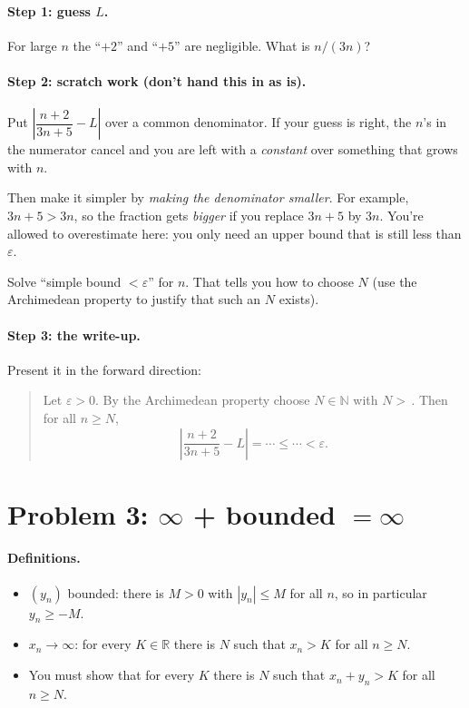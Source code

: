 \documentclass[11pt]{article}
\begin{document}
\paragraph{Step 1: guess $L$.} For large $n$ the ``$+2$'' and ``$+5$'' are
negligible. What is $n/(3n)$?

\paragraph{Step 2: scratch work (don't hand this in as is).}
Put $\left|\dfrac{n+2}{3n+5}-L\right|$ over a common denominator. If your
guess is right, the $n$'s in the numerator cancel and you are left with a
\emph{constant} over something that grows with $n$.

Then make it simpler by \emph{making the denominator smaller}. For
example, $3n+5>3n$, so the fraction gets \emph{bigger} if you replace
$3n+5$ by $3n$. You're allowed to overestimate here: you only need an
upper bound that is still less than $\varepsilon$.

Solve ``simple bound $<\varepsilon$'' for $n$. That tells you how to
choose $N$ (use the Archimedean property to justify that such an $N$
exists).

\paragraph{Step 3: the write-up.} Present it in the forward direction:
\begin{quote}
Let $\varepsilon>0$. By the Archimedean property choose $N\in\mathbb{N}$
with $N>\,$\underline{\hspace{1.5cm}}. Then for all $n\ge N$,
\[
  \left|\frac{n+2}{3n+5}-L\right| = \cdots \le \cdots < \varepsilon .
\]
\end{quote}

\section*{Problem 3: $\infty$ + bounded $=\infty$}

\paragraph{Definitions.}
\begin{itemize}
  \item $(y_n)$ bounded: there is $M>0$ with $|y_n|\le M$ for all $n$,
        so in particular $y_n\ge -M$.
  \item $x_n\to\infty$: for every $K\in\mathbb{R}$ there is $N$ such that
        $x_n>K$ for all $n\ge N$.
  \item You must show that for every $K$ there is $N$ such that
        $x_n+y_n>K$ for all $n\ge N$.
\end{itemize}
\end{document}

